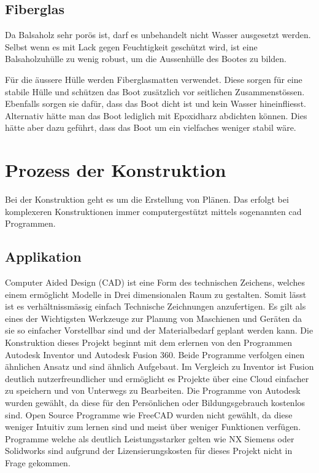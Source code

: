 \subsection{Fiberglas}
Da Balsaholz sehr porös ist, darf es unbehandelt nicht Wasser ausgesetzt werden. Selbst wenn es mit Lack gegen Feuchtigkeit geschützt wird, ist eine Balsaholzuhülle zu wenig robust, um die Aussenhülle des Bootes zu bilden.

Für die äussere Hülle werden Fiberglasmatten verwendet. Diese sorgen für eine stabile Hülle und schützen das Boot zusätzlich vor seitlichen Zusammenstössen. Ebenfalls sorgen sie dafür, dass das Boot dicht ist und kein Wasser hineinfliesst. Alternativ hätte man das Boot lediglich mit Epoxidharz abdichten können. Dies hätte aber dazu geführt, dass das Boot um ein vielfaches weniger stabil wäre. 

\section{Prozess der Konstruktion}
Bei der Konstruktion geht es um die Erstellung von Plänen. Das erfolgt bei komplexeren Konstruktionen immer computergestützt mittels sogenannten \ac{cad} Programmen. 

\subsection{Applikation}
Computer Aided Design (CAD) ist eine Form des technischen Zeichens, welches einem ermöglicht Modelle in Drei dimensionalen Raum zu gestalten. Somit lässt ist es verhältnissmässig einfach Technische Zeichnungen anzufertigen. Es gilt als eines der Wichtigsten Werkzeuge zur Planung von Maschienen und Geräten da sie so einfacher Vorstellbar sind und der Materialbedarf geplant werden kann. Die Konstruktion dieses Projekt beginnt mit dem erlernen von den Programmen Autodesk Inventor und Autodesk Fusion 360. 
Beide Programme verfolgen einen ähnlichen Ansatz und sind ähnlich Aufgebaut. Im Vergleich zu Inventor ist Fusion deutlich nutzerfreundlicher und ermöglicht es Projekte über eine Cloud einfacher zu speichern und von Unterwegs zu Bearbeiten. Die Programme von Autodesk wurden gewählt, da diese für den Persönlichen oder Bildungsgebrauch kostenlos sind. Open Source Programme wie FreeCAD wurden nicht gewählt, da diese weniger Intuitiv zum lernen sind und meist über weniger Funktionen verfügen. Programme welche als deutlich Leistungsstarker gelten wie NX Siemens oder Solidworks sind aufgrund der Lizensierungskosten für dieses Projekt nicht in Frage gekommen. 

